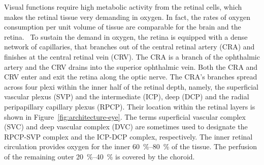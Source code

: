 \documentclass[12pt,a4paper]{journal}
\begin{document}
Visual functions require high metabolic activity from the retinal cells, which makes the retinal tissue very demanding in oxygen.
In fact, the rates of oxygen consumption per unit volume of tissue are comparable for the brain and the retina.~\cite{Medrano_1995}
To sustain the demand in oxygen, the retina is equipped with a dense network of capillaries, that branches out of the central retinal artery (CRA) and finishes at the central retinal vein (CRV).
The CRA is a branch of the ophthalmic artery and the CRV drains into the superior ophthalmic vein.
Both the CRA and CRV enter and exit the retina along the optic nerve.
The CRA's branches spread across four plexi within the inner half of the retinal depth, namely, the superficial vascular plexus (SVP) and the intermediate (ICP), deep (DCP) and the radial peripapillary capillary plexus (RPCP).
Their location within the retinal layers is shown in Figure~\ref{fig:architecture-eye}.
The terms superficial vascular complex (SVC) and deep vascular complex (DVC) are sometimes used to designate the RPCP-SVP complex and the ICP-DCP complex, respectively.
The inner retinal circulation provides oxygen for the inner \SIrange{60}{80}{\percent} of the tissue.\cite{Birol_2007}
The perfusion of the remaining outer \SIrange{20}{40}{\percent} is covered by the choroid.
\end{document}
